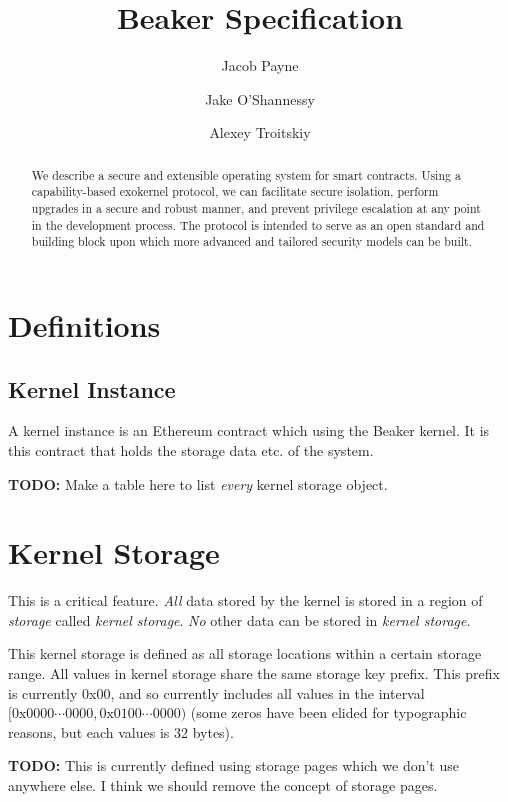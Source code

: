 \documentclass[english,a4paper]{article}
\title{Beaker Specification}\label{beaker-specification}
\author{Jacob Payne \and Jake O'Shannessy \and Alexey Troitskiy}
\begin{document}
\maketitle

\begin{abstract}\label{abstract}

We describe a secure and extensible operating system for smart contracts. Using
a capability-based exokernel protocol, we can facilitate secure isolation,
perform upgrades in a secure and robust manner, and prevent privilege escalation
at any point in the development process. The protocol is intended to serve as an
open standard and building block upon which more advanced and tailored security
models can be built.

\end{abstract}

\newpage
\tableofcontents
\newpage

\section{Definitions}\label{definitions}

\subsection{Kernel Instance}
A kernel instance is an Ethereum contract which using the Beaker kernel. It is
this contract that holds the storage data etc. of the system.

\textbf{TODO:} Make a table here to list \emph{every} kernel storage object.

\section{Kernel Storage}\label{kernel-storage}
This is a critical feature. \emph{All} data stored by the kernel is stored in a
region of \emph{storage} called \emph{kernel storage}. \emph{No} other data can
be stored in \emph{kernel storage}.

This kernel storage is defined as all storage locations within a certain storage
range. All values in kernel storage share the same storage key prefix. This
prefix is currently 0x00, and so currently includes all values in the interval
$[0\text{x}0000 \cdots 0000, 0\text{x}0100 \cdots 0000)$ (some zeros have been
elided for typographic reasons, but each values is 32 bytes).

\textbf{TODO:} This is currently defined using storage pages which we don't use
anywhere else. I think we should remove the concept of storage pages.
\end{document}
